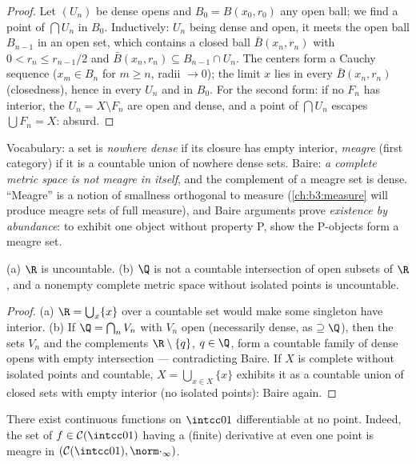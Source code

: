 \begin{proof}
Let $(U_n)$ be dense opens and $B_0 = B(x_0, r_0)$ any open
ball; we find a point of $\bigcap U_n$ in $B_0$. Inductively:
$U_{n}$ being dense and open, it meets the open ball $B_{n-1}$
in an open set, which contains a closed ball $\bar B(x_n, r_n)$
with $0 < r_n \leq r_{n-1}/2$ and $\bar B(x_n, r_n) \subseteq
B_{n-1}\cap U_n$. The centers form a Cauchy sequence ($x_m \in
B_n$ for $m \geq n$, radii $\to 0$); the limit $x$ lies in
every $\bar B(x_n, r_n)$ (closedness), hence in every $U_n$ and
in $B_0$. For the second form: if no $F_n$ has interior, the
$U_n = X \setminus F_n$ are open and dense, and a point of
$\bigcap U_n$ escapes $\bigcup F_n = X$: absurd.
\end{proof}

\begin{remark}\label{rem:b3:complete:meagre}
Vocabulary: a set is \emph{nowhere dense} if its closure has
empty interior, \emph{meagre} (first category)
if it is a countable union of nowhere dense sets. Baire:
\emph{a complete metric space is not meagre in itself}, and the
complement of a meagre set is dense. ``Meagre'' is a notion of
smallness orthogonal to measure (\cref{ch:b3:measure} will
produce meagre sets of full measure), and Baire arguments prove
\emph{existence by abundance}: to exhibit one object without
property P, show the P-objects form a meagre set.
\end{remark}

\begin{corollary}\label{cor:b3:complete:bairecors}
(a) $\R$ is uncountable. (b) $\Q$ is not a countable
intersection of open subsets of $\R$, and a nonempty complete
metric space without isolated points is uncountable.
\end{corollary}

\begin{proof}
(a) $\R = \bigcup_{x}\{x\}$ over a countable set would make some
singleton have interior. (b) If $\Q = \bigcap_n V_n$ with $V_n$
open (necessarily dense, as $\supseteq \Q$), then the sets
$V_n$ and the complements $\R\setminus\{q\}$, $q \in \Q$, form a
countable family of dense opens with empty intersection ---
contradicting Baire. If $X$ is complete without isolated points
and countable, $X = \bigcup_{x \in X}\{x\}$ exhibits it as a
countable union of closed sets with empty interior (no isolated
points): Baire again.
\end{proof}

\begin{theorem}
\label{thm:b3:complete:nowherediff}
There exist continuous functions on $\intcc01$ differentiable at
no point. Indeed, the set of $f \in \mathcal C(\intcc01)$
having a (finite) derivative at even one point is meagre in
$(\mathcal C(\intcc01), \norm\cdot_\infty)$.
\end{theorem}

